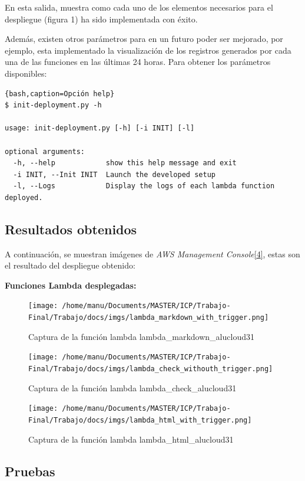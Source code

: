\documentclass[
]{article}
\begin{document}
En esta salida, muestra como cada uno de los elementos necesarios para
el despliegue (figura 1) ha sido implementada con éxito.

Además, existen otros parámetros para en un futuro poder ser mejorado,
por ejemplo, esta implementado la visualización de los registros
generados por cada una de las funciones en las últimas 24 horas. Para
obtener los parámetros disponibles:

\begin{lstlisting}{bash,caption=Opción help}
$ init-deployment.py -h

usage: init-deployment.py [-h] [-i INIT] [-l]

optional arguments:
  -h, --help            show this help message and exit
  -i INIT, --Init INIT  Launch the developed setup
  -l, --Logs            Display the logs of each lambda function deployed.
\end{lstlisting}

\hypertarget{header-n172}{%
\subsection{Resultados obtenidos}\label{header-n172}}

A continuación, se muestran imágenes de \textit{AWS Management
Console}\protect\hyperlink{1}{{[}4{]}}, estas son el resultado del
despliegue obtenido:

\textbf{Funciones Lambda desplegadas:}

\begin{figure}[H]
\centering
\texttt{[image: /home/manu/Documents/MASTER/ICP/Trabajo-Final/Trabajo/docs/imgs/lambda\_markdown\_with\_trigger.png]}
\caption{Captura de la función lambda lambda\_markdown\_alucloud31}
\end{figure}

\begin{figure}[H]
\centering
\texttt{[image: /home/manu/Documents/MASTER/ICP/Trabajo-Final/Trabajo/docs/imgs/lambda\_check\_withouth\_trigger.png]}
\caption{Captura de la función lambda lambda\_check\_alucloud31}
\end{figure}

\begin{figure}[H]
\centering
\texttt{[image: /home/manu/Documents/MASTER/ICP/Trabajo-Final/Trabajo/docs/imgs/lambda\_html\_with\_trigger.png]}
\caption{Captura de la función lambda lambda\_html\_alucloud31}
\end{figure}

\hypertarget{header-n178}{%
\subsection{Pruebas}\label{header-n178}}
\end{document}
